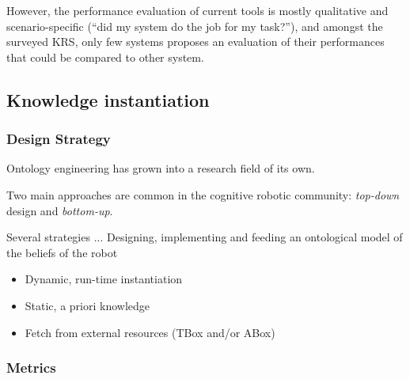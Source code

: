 \documentclass[a4paper, twocolumn]{article}
\begin{document}
However, the performance evaluation of current tools is mostly qualitative and
scenario-specific (``did my system do the job for my task?''), and amongst the
surveyed KRS, only few systems proposes an evaluation of their performances
that could be compared to other system.

\subsection{Knowledge instantiation}

\begin{scriptsize}
\begin{center}
\end{center}
\end{scriptsize}

\subsubsection{Design Strategy}

Ontology engineering has grown into a research field of its own.

Two main approaches are common in the cognitive robotic community:
\emph{top-down} design and \emph{bottom-up}.

Several strategies ... Designing, implementing and feeding an ontological model of the beliefs of the robot

\begin{itemize}
    \item Dynamic, run-time instantiation
    \item Static, a priori knowledge
    \item Fetch from external resources (TBox and/or ABox)
\end{itemize}

\subsubsection{Metrics}
\end{document}

